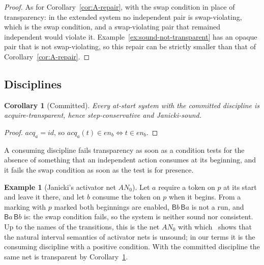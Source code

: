 \documentclass[preprint,12pt]{elsarticle}
\theoremstyle{plain}
\newtheorem{corollary}[theorem]{Corollary}
\theoremstyle{definition}
\newtheorem{example}[theorem]{Example}
\newcommand{\en}{\mathit{en}}
\newcommand{\acq}{\mathit{acq}}
\newcommand{\id}{\mathit{id}}
\newcommand{\B}[1]{\mathsf{B}#1}
\begin{document}
\begin{proof}
As for Corollary~\ref{cor:A-repair}, with the swap condition in place of transparency: in the extended system no independent pair is swap-violating, which is the swap condition, and a swap-violating pair that remained independent would violate it. Example~\ref{ex:sound-not-transparent} has an opaque pair that is not swap-violating, so this repair can be strictly smaller than that of Corollary~\ref{cor:A-repair}.
\end{proof}

\subsection{Disciplines}
\label{sec:A-disciplines}

\begin{corollary}[Committed]
\label{cor:committed}
Every at-start system with the committed discipline is acquire-transparent, hence step-conservative and Janicki-sound.
\end{corollary}

\begin{proof}
$\acq_a = \id$, so $\acq_a(t) \in \en_b \iff t \in \en_b$.
\end{proof}

A consuming discipline fails transparency as soon as a condition tests for the absence of something that an independent action consumes at its beginning, and it fails the swap condition as soon as the test is for presence.

\begin{example}[Janicki's activator net $\mathit{AN}_0$]
\label{ex:AN0}
Let $a$ require a token on $p$ at its start and leave it there, and let $b$ consume the token on $p$ when it begins. From a marking with $p$ marked both beginnings are enabled, $\B{b}\,\B{a}$ is not a run, and $\B{a}\,\B{b}$ is: the swap condition fails, so the system is neither sound nor consistent. Up to the names of the transitions, this is the net $\mathit{AN}_0$ with which~\cite[Sect.~5]{Janicki2019} shows that the natural interval semantics of activator nets is unsound; in our terms it is the consuming discipline with a positive condition. With the committed discipline the same net is transparent by Corollary~\ref{cor:committed}.
\end{example}
\end{document}
